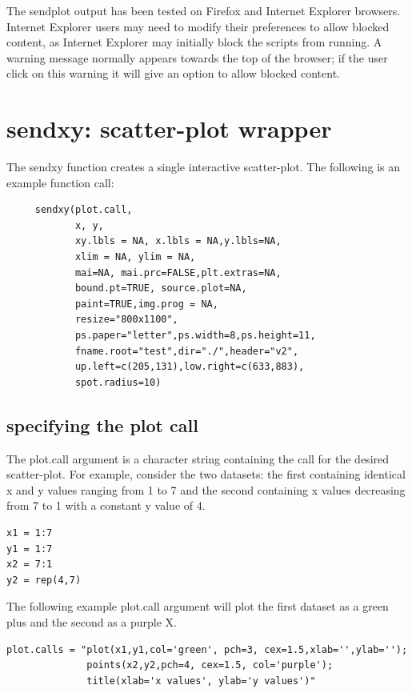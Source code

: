 \documentclass[]{article}
\begin{document}
\vskip5mm
 The sendplot output has been tested on Firefox and Internet Explorer browsers.  Internet Explorer users may need to modify their preferences to allow blocked content, as Internet Explorer may initially block the scripts from running. A warning message normally appears towards the top of the browser; if the user click on this warning it will give an option to allow blocked content.



\section{sendxy: scatter-plot wrapper}

The sendxy function creates a single interactive scatter-plot. The following is an example function call:
\begin{verbatim}
     sendxy(plot.call,
            x, y, 
            xy.lbls = NA, x.lbls = NA,y.lbls=NA,
            xlim = NA, ylim = NA,
            mai=NA, mai.prc=FALSE,plt.extras=NA,
            bound.pt=TRUE, source.plot=NA,
            paint=TRUE,img.prog = NA,
            resize="800x1100",
            ps.paper="letter",ps.width=8,ps.height=11,
            fname.root="test",dir="./",header="v2",
            up.left=c(205,131),low.right=c(633,883),
            spot.radius=10)
 \end{verbatim}


\subsection{specifying the plot call}
The plot.call argument is a character string containing the call for the desired scatter-plot. For example, consider the two datasets: the first containing identical x and y values ranging from 1 to 7 and the second containing x values decreasing from 7 to 1 with a constant y value of 4.

\begin{verbatim}
x1 = 1:7
y1 = 1:7  
x2 = 7:1
y2 = rep(4,7)
\end{verbatim}

The following example plot.call argument will plot the first dataset as a green plus and the second as a purple X. 

\begin{verbatim}
plot.calls = "plot(x1,y1,col='green', pch=3, cex=1.5,xlab='',ylab='');
              points(x2,y2,pch=4, cex=1.5, col='purple');
              title(xlab='x values', ylab='y values')"
\end{verbatim}
\end{document}
